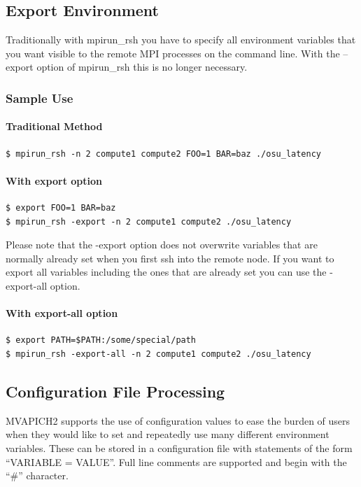 \subsection{Export Environment}
\label{subsec:export-env}
Traditionally with mpirun\_rsh you have to specify all environment variables
that you want visible to the remote MPI processes on the command line.  With
the --export option of mpirun\_rsh this is no longer necessary.

\subsubsection{Sample Use}
\paragraph{Traditional Method}
\begin{verbatim}
$ mpirun_rsh -n 2 compute1 compute2 FOO=1 BAR=baz ./osu_latency
\end{verbatim}

\paragraph{With export option}
\begin{verbatim}
$ export FOO=1 BAR=baz
$ mpirun_rsh -export -n 2 compute1 compute2 ./osu_latency
\end{verbatim}

Please note that the -export option does not overwrite variables that are
normally already set when you first ssh into the remote node.  If you want to
export all variables including the ones that are already set you can use the
-export-all option.

\paragraph{With export-all option}
\begin{verbatim}
$ export PATH=$PATH:/some/special/path
$ mpirun_rsh -export-all -n 2 compute1 compute2 ./osu_latency
\end{verbatim}

\subsection{Configuration File Processing}
\label{subsec:conf-file}
MVAPICH2 supports the use of configuration values to ease the burden of users
when they would like to set and repeatedly use many different environment
variables.  These can be stored in a configuration file with statements of the
form ``VARIABLE = VALUE''.  Full line comments are supported and begin with the
``\#'' character.

